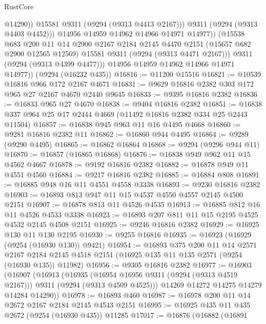 \begin{lexlean}{RustCore}
\begin{coremodule}
                      @14290))
                  @15581
                  @9311
                  (@9294 (@9313 @4413 @2167)))
                @9311
                (@9294 (@9313 @4403 @4452)))
              @14956
              @14959
              @14962
              @14966
              @14971
              @14977))
          (@15538
            @683
            @200
            @11
            @14
            @2900
            @2167
            @2184
            @2145
            @4470
            @2151
            (@15657 @682 @2900 @12565 @12569)
            @15581
            @9311
            (@9294 (@9313 @4471 @2167)))
          @9311
          (@9294 (@9313 @4399 @4477)))
        @14956
        @14959
        @14962
        @14966
        @14971
        @14977))
    (@9294 (@16232 @435))
@16816 := @11200 @15516
@16821 := @10539 @16816 @966 @172 @2167 @4671
@16831 := @9629 @16816 @2382 @303 @172 @965 @27 @2167 @4670 @2440 @9645
@16833 := @9395 @16816 @2382
@16836 := @16833 @965 @27 @4670
@16838 := @9404 @16816 @2382
@16851 := @16838 @337 @964 @25 @17 @2444 @4669 (@11492 @16816 @2382 @334 @25 @2443 @11504)
@16857 := @16838 @945 @963 @11 @16 @4495 @4668
@16860 := @9281 @16816 @2382 @11
@16862 := @16860 @944 @4495
@16864 := @9289 (@9290 @4495)
@16865 := @16862 @16864
@16868 := @9294 (@9296 @944 @11)
@16870 := @16857 (@16865 @16868)
@16876 := @16838 @949 @962 @11 @15 @4562 @4667
@16878 := @9192 @16816 @2382
@16882 := @16878 @949 @11 @4551 @4560
@16884 := @9217 @16816 @2382
@16885 := @16884 @808
@16891 := @16885 @948 @16 @11 @4551 @4558 @3338
@16893 := @9230 @16816 @2382
@16903 := @16893 @813 @947 @11 @15 @4537 @4550 @4557 @2145 @4500 @2151
@16907 := @16878 @813 @11 @4526 @4535
@16913 := @16885 @812 @16 @11 @4526 @4533 @3338
@16923 := @16893 @207 @811 @11 @15 @2195 @4525 @4532 @2145 @4508 @2151
@16925 := @9246 @16816 @2382
@16929 := @16925 @130 @11 @130 @2195
@16930 := @9255 @16816
@16935 := @16923 (@16929 (@9254 (@16930 @130)) @9421)
@16954 := @16893
    @375
    @200
    @11
    @14
    @2571
    @2167
    @2184
    @2145
    @4518
    @2151
    (@16925 @135 @11 @135 @2571 (@9254 (@16930 @135)) @11982)
@16956 := @9305 @16816 @2382
@16977 := @16903
    (@16907
      (@16913
        (@16935 (@16954 @16956 @9311 (@9294 (@9313 @4519 @2167))) @9311 (@9294 (@9313 @4509 @4525)))
        @14269
        @14272
        @14275
        @14279
        @14284
        @14290))
@16978 := @16893 @460
@16987 := @16978 @200 @11 @14 @2672 @2167 @2184 @2145 @4543 @2151
@16995 := @16925 @435 @11 @435 @2672 (@9254 (@16930 @435)) @11285
@17017 := @16876
    (@16882
      (@16891

\end{coremodule}
\end{lexlean}
